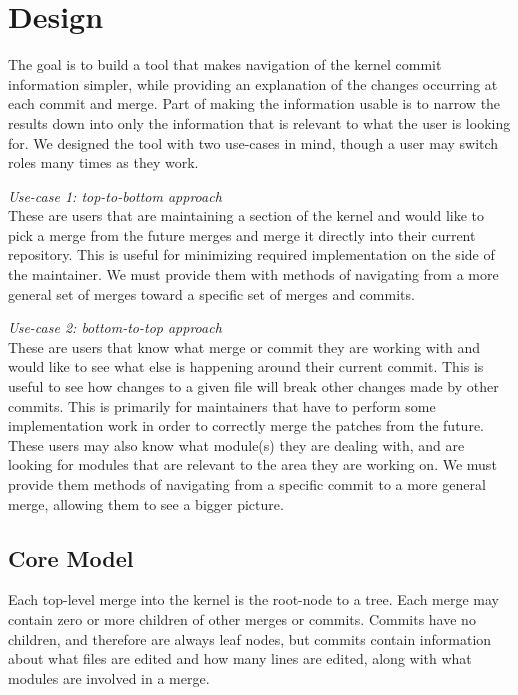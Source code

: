 \documentclass[conference, draftclsnofoot]{IEEEtran}
\begin{document}
\section{Design}
The goal is to build a tool that makes navigation of the kernel commit
information simpler, while providing an explanation of the changes occurring at
each commit and merge. Part of making the information usable is to narrow the
results down into only the information that is relevant to what the user is
looking for. We designed the tool with two use-cases in mind, though a user may
switch roles many times as they work.

\textit{Use-case 1: top-to-bottom approach}\\
These are users that are maintaining a section of the kernel and would like to
pick a merge from the future merges and merge it directly into their current
repository. This is useful for minimizing required implementation on the side
of the maintainer. We must provide them with methods of navigating from a more
general set of merges toward a specific set of merges and commits.

\textit{Use-case 2: bottom-to-top approach}\\
These are users that know what merge or commit they are working with and would
like to see what else is happening around their current commit. This is useful
to see how changes to a given file will break other changes made by other
commits. This is primarily for maintainers that have to perform some
implementation work in order to correctly merge the patches from the future.
These users may also know what module(s) they are dealing with, and are looking
for modules that are relevant to the area they are working on. We must provide
them methods of navigating from a specific commit to a more general merge,
allowing them to see a bigger picture.

\subsection{Core Model}
Each top-level merge into the kernel is the root-node to a tree. Each merge
may contain zero or more children of other merges or commits. Commits have no
children, and therefore are always leaf nodes, but commits contain information
about what files are edited and how many lines are edited, along with what
modules are involved in a merge.
\end{document}
